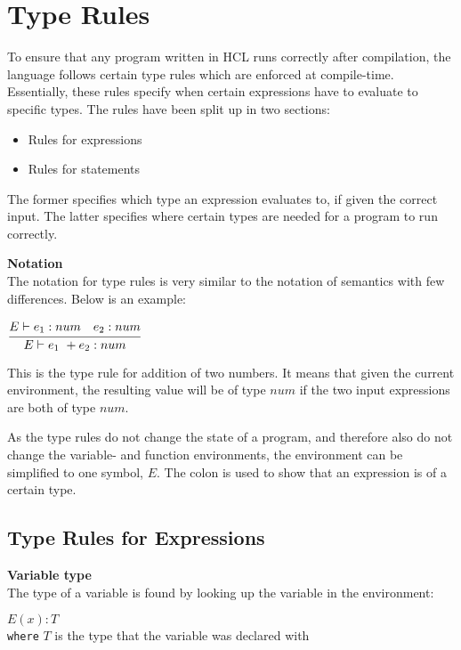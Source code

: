 \section{Type Rules}
To ensure that any program written in HCL runs correctly after compilation, the language follows certain type rules which are enforced at compile-time.
Essentially, these rules specify when certain expressions have to evaluate to specific types.
The rules have been split up in two sections:
\begin{itemize}
	\item Rules for expressions
	\item Rules for statements
\end{itemize}
The former specifies which type an expression evaluates to, if given the correct input.
The latter specifies where certain types are needed for a program to run correctly.

\textbf{Notation}\\
The notation for type rules is very similar to the notation of semantics with few differences.
Below is an example:\\
\begin{center}
	\begin{math}
	\cfrac
	{E \vdash e_1 : num \quad e_2 : num}
	{E \vdash e_1\ + e_2 : num}
	\end{math}
\end{center}
This is the type rule for addition of two numbers.
It means that given the current environment, the resulting value will be of type $num$ if the two input expressions are both of type $num$.

As the type rules do not change the state of a program, and therefore also do not change the variable- and function environments, the environment can be simplified to one symbol, $E$.
The colon is used to show that an expression is of a certain type.

\subsection{Type Rules for Expressions}


\textbf{Variable type}\\
The type of a variable is found by looking up the variable in the environment:\\
\begin{center}
	\begin{math}
	E(x) : T
	\end{math}
	\\[1\baselineskip]
	\texttt{where} $T$ is the type that the variable was declared with
\end{center}


